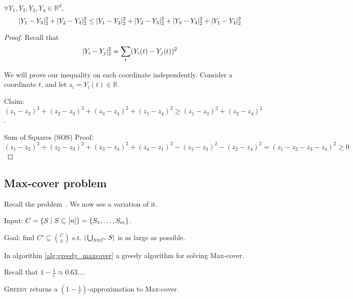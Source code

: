     \begin{lemma}
        $\forall Y_1, Y_2, Y_3, Y_4 \in \mathbb{R}^d$,
        \[ \vert Y_1 - Y_3 \vert_2^2 + \vert Y_2 - Y_4 \vert_2^2 \leq \vert Y_1 - Y_2 \vert_2^2 + \vert Y_2 - Y_3 \vert_2^2 + \vert Y_3 - Y_4 \vert_2^2 + \vert Y_1 - Y_4 \vert_2^2 \]
    \end{lemma}

    \begin{proof}
        Recall that
        \[ \vert Y_i - Y_j \vert_2^2 = \sum_{t} (Y_i(t) - Y_j(t))^2 \]

        We will prove our inequality on each coordinate independently.
        Consider a coordinate $t$, and let $z_i = Y_i(t) \in \mathbb{R}$.

        Claim: $(z_1 - z_2)^2 + (z_2 - z_3)^2 + (z_3 - z_4)^2 + (z_1 - z_4)^2 \geq (z_1 - z_3)^2 + (z_2 - z_4)^2$.

        Sum of Squares (SOS) Proof:
        $(z_1 - z_2)^2 + (z_2 - z_3)^2 + (z_3 - z_4)^2 + (z_4 - z_1)^2 - (z_1 - z_3)^2 - (z_2 - z_4)^2 = (z_1 - z_2 - z_3 - z_4)^2 \geq 0$
    \end{proof}


\subsection{Max-cover problem}

    Recall the problem~.
    We now see a variation of it.

    Input: $C = \{ S \; \vert \; S \subseteq [n] \} = \{ S_1, \dots, S_m \}$.

    Goal: find $C' \subseteq \binom{C}{k}$ s.t. $\vert \bigcup_{S \in C'} S \vert$ is as large as possible.

    In algorithm \ref{alg:greedy_maxcover} a greedy algorithm for solving Max-cover.

    

    Recall that $1 - \frac{1}{e} \approx 0.63\dots$.

    \begin{theorem}
        \textsc{Greedy} returns a $(1 - \frac{1}{e})$-approximation to Max-cover.
    \end{theorem}

